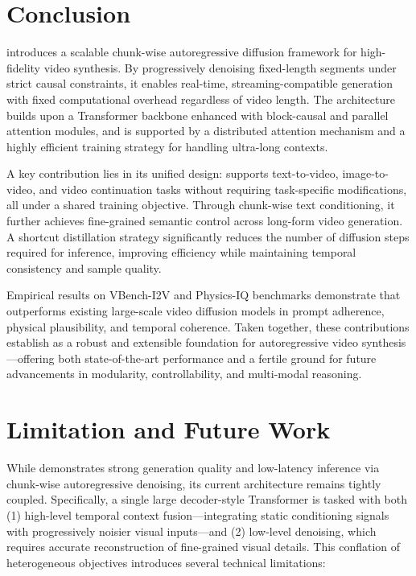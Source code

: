 
\section{Conclusion}
\magi introduces a scalable chunk-wise autoregressive diffusion framework for high-fidelity video synthesis. By progressively denoising fixed-length segments under strict causal constraints, it enables real-time, streaming-compatible generation with fixed computational overhead regardless of video length. The architecture builds upon a Transformer backbone enhanced with block-causal and parallel attention modules, and is supported by a distributed attention mechanism and a highly efficient training strategy for handling ultra-long contexts.

A key contribution lies in its unified design: \magi supports text-to-video, image-to-video, and video continuation tasks without requiring task-specific modifications, all under a shared training objective. Through chunk-wise text conditioning, it further achieves fine-grained semantic control across long-form video generation. A shortcut distillation strategy significantly reduces the number of diffusion steps required for inference, improving efficiency while maintaining temporal consistency and sample quality.

Empirical results on VBench-I2V and Physics-IQ benchmarks demonstrate that \magi outperforms existing large-scale video diffusion models in prompt adherence, physical plausibility, and temporal coherence. Taken together, these contributions establish \magi as a robust and extensible foundation for autoregressive video synthesis—offering both state-of-the-art performance and a fertile ground for future advancements in modularity, controllability, and multi-modal reasoning.



\section{Limitation and Future Work}

While \magi demonstrates strong generation quality and low-latency inference via chunk-wise autoregressive denoising, its current architecture remains tightly coupled. Specifically, a single large decoder-style Transformer is tasked with both (1) high-level temporal context fusion—integrating static conditioning signals with progressively noisier visual inputs—and (2) low-level denoising, which requires accurate reconstruction of fine-grained visual details. This conflation of heterogeneous objectives introduces several technical limitations:

